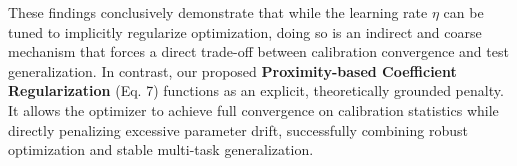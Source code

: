 \documentclass{article}
\theoremstyle{plain}
\theoremstyle{definition}
\theoremstyle{remark}
\begin{document}
These findings conclusively demonstrate that while the learning rate $\eta$ can be tuned to implicitly regularize optimization, doing so is an indirect and coarse mechanism that forces a direct trade-off between calibration convergence and test generalization. In contrast, our proposed \textbf{Proximity-based Coefficient Regularization} (Eq. 7) functions as an explicit, theoretically grounded penalty. It allows the optimizer to achieve full convergence on calibration statistics while directly penalizing excessive parameter drift, successfully combining robust optimization and stable multi-task generalization.
\end{document}
